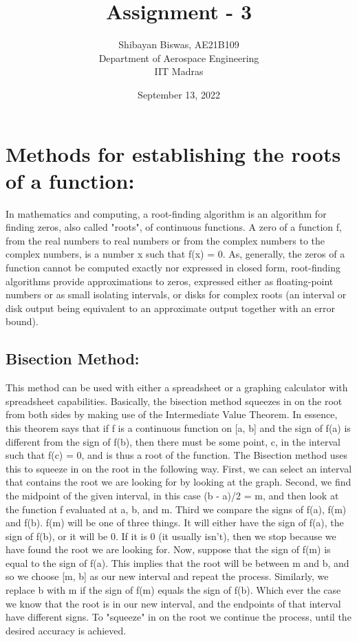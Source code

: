 \documentclass[12pt,a4paper]{article}
\author{Shibayan Biswas, AE21B109\\ Department of Aerospace Engineering\\ IIT Madras}
\title{Assignment - 3}
\date{September 13, 2022}
\begin{document}
\maketitle
\hline
\section{Methods for establishing the roots of a function:}
In mathematics and computing, a root-finding algorithm is an algorithm for finding zeros, also called "roots", of continuous functions. A zero of a function f, from the real numbers to real numbers or from the complex numbers to the complex numbers, is a number x such that f(x) = 0. As, generally, the zeros of a function cannot be computed exactly nor expressed in closed form, root-finding algorithms provide approximations to zeros, expressed either as floating-point numbers or as small isolating intervals, or disks for complex roots (an interval or disk output being equivalent to an approximate output together with an error bound).
\subsection{Bisection Method:}
This method can be used with either a spreadsheet or a graphing calculator with spreadsheet capabilities. Basically, the bisection method squeezes in on the root from both sides by making use of the Intermediate Value Theorem. In essence, this theorem says that if f is a continuous function on [a, b] and the sign of f(a) is different from the sign of f(b), then there must be some point, c, in the interval such that f(c) = 0, and is thus a root of the function. The Bisection method uses this to squeeze in on the root in the following way. First, we can select an interval that contains the root we are looking for by looking at the graph. Second, we find the midpoint of the given interval, in this case (b - a)/2 = m, and then look at the function f evaluated at a, b, and m. Third we compare the signs of f(a), f(m) and f(b). f(m) will be one of three things. It will either have the sign of f(a), the sign of f(b), or it will be 0. If it is 0 (it usually isn't), then we stop because we have found the root we are looking for. Now, suppose that the sign of f(m) is equal to the sign of f(a). This implies that the root will be between m and b, and so we choose [m, b] as our new interval and repeat the process. Similarly, we replace b with m if the sign of f(m) equals the sign of f(b). Which ever the case we know that the root is in our new interval, and the endpoints of that interval have different signs. To "squeeze" in on the root we continue the process, until the desired accuracy is achieved.
\end{document}
